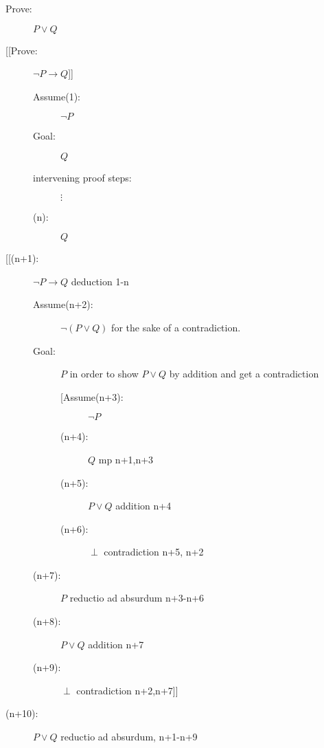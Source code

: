 \documentclass[12pt]{article}
\begin{document}
\begin{description}

\item[Prove:]  $P \vee Q$

\item[[[Prove:]  $\neg P \rightarrow Q$]]

\begin{description}


\item[Assume(1):]  $\neg P$

\item[Goal:]  $Q$

\item[intervening proof steps:]  $\vdots$

\item[(n):]  $Q$

\end{description}

\item[[[(n+1):]  $\neg P \rightarrow Q$ deduction 1-n

\begin{description}

\item[Assume(n+2):] $\neg(P \vee Q)$ for the sake of a contradiction.

\item[Goal:]  $P$ in order to show $P \vee Q$ by addition and get a contradiction

\begin{description}

\item[[Assume(n+3):]  $\neg P$

\item[(n+4):]  $Q$ mp n+1,n+3

\item[(n+5):]  $P \vee Q$ addition n+4

\item[(n+6):]  $\perp$ contradiction n+5, n+2

\end{description}

\item[(n+7):]  $P$ reductio ad absurdum n+3-n+6

\item[(n+8):]  $P \vee Q$ addition n+7

\item[(n+9):]  $\perp$ contradiction n+2,n+7]]

\end{description}

\item[(n+10):]  $P \vee Q$ reductio ad absurdum, n+1-n+9

\end{description}
\end{document}
